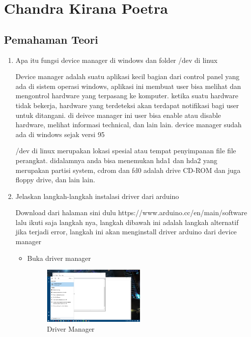 \section{Chandra Kirana Poetra}
\subsection{Pemahaman Teori}
\begin{enumerate}
\item Apa itu fungsi device manager di windows dan folder /dev di linux

Device manager adalah suatu aplikasi kecil bagian dari control panel yang ada di sistem operasi windows, aplikasi ini membuat user bisa melihat dan mengontrol hardware yang terpasang ke komputer. ketika suatu hardware tidak bekerja, hardware yang terdeteksi akan terdapat notifikasi bagi user untuk ditangani. di deivce manager ini user bisa enable atau disable hardware, melihat informasi technical, dan lain lain. device manager sudah ada di windows sejak versi 95

/dev di linux merupakan lokasi spesial atau tempat penyimpanan file file perangkat. didalamnya anda bisa menemukan hda1 dan hda2 yang merupakan partisi system, cdrom dan fd0 adalah drive CD-ROM dan juga floppy drive, dan lain lain.

\item Jelaskan langkah-langkah instalasi driver dari arduino

Download dari halaman sini dulu https://www.arduino.cc/en/main/software lalu ikuti saja langkah nya,
langkah dibawah ini adalah langkah alternatif jika terjadi error, langkah ini akan menginstall driver arduino dari device manager
	\begin{itemize}
	\item Buka driver manager
	\begin{figure}[ht!]
		\includegraphics[width=5cm]{figures/5/1174079/DeviceManager.png}
		\centering
		\caption{Driver Manager}
	\end{figure}
	

\end{itemize}
\end{enumerate}
